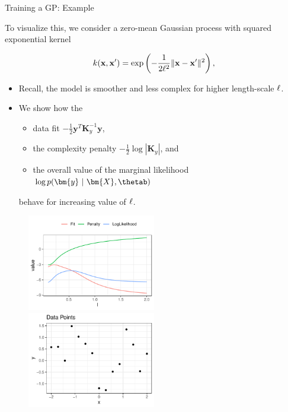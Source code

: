 \begin{vbframe}{Training a GP: Example}

To visualize this, we consider a zero-mean Gaussian process with squared exponential kernel

$$
k(\mathbf{x}, \mathbf{x}^\prime) = \exp\left(-\frac{1}{2\ell^2}\|\mathbf{x} - \mathbf{x}^\prime\|^2\right),
$$


\begin{itemize}
	\item Recall, the model is smoother and less complex for higher length-scale $\ell$.
	\item We show how the 
	\begin{itemize}
		\item data fit $-\frac{1}{2}\bm{y}^T\bm{K}_y^{-1} \bm{y}$, 
		\item the complexity penalty $- \frac{1}{2} \log \left| \bm{K}_y \right|$, and 
		\item the overall value of the marginal likelihood $\log p(\bm{y} ~|~ \bm{X}, \thetab)$ 
	\end{itemize}
	behave for increasing value of $\ell$.
\end{itemize}

\framebreak 

\begin{figure}
	\includegraphics[width = 0.5\textwidth]{figure_man/training/fit-vs-penalty.pdf}~	\includegraphics[width = 0.5\textwidth]{figure_man/training/datapoints.pdf}
\end{figure}


\end{vbframe}
